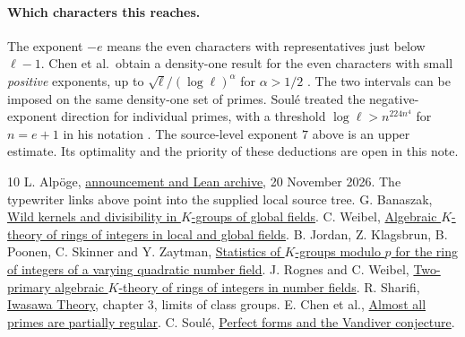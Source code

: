 \documentclass[11pt]{article}
\begin{document}
\paragraph{Which characters this reaches.}
The exponent $-e$ means the even characters with representatives just below
$\ell-1$. Chen et al.\ obtain a density-one result for the even characters
with small \emph{positive} exponents, up to $\sqrt{\ell}/(\log\ell)^\alpha$
for $\alpha>1/2$ \cite{chen}. The two intervals can be imposed on the
same density-one set of primes. Soul\'e treated the negative-exponent
direction for individual primes, with a threshold
$\log\ell>n^{224n^4}$ for $n=e+1$ in his notation \cite{soule}.
The source-level exponent $7$ above is an upper estimate. Its optimality
and the priority of these deductions are open in this note.

\small
\begin{thebibliography}{10}
 L. Alp\"oge, \href{https://alpo.ge/remark.pdf}{announcement and Lean archive}, 20 November 2026. The typewriter links above point into the supplied local source tree.
 G. Banaszak, \href{https://arxiv.org/abs/1208.2137}{Wild kernels and divisibility in \(K\)-groups of global fields}.
 C. Weibel, \href{https://sites.math.rutgers.edu/~weibel/papers-dir/KZsurvey-published.pdf}{Algebraic \(K\)-theory of rings of integers in local and global fields}.
 B. Jordan, Z. Klagsbrun, B. Poonen, C. Skinner and Y. Zaytman, \href{https://arxiv.org/abs/1703.00108}{Statistics of \(K\)-groups modulo \(p\) for the ring of integers of a varying quadratic number field}.
 J. Rognes and C. Weibel, \href{https://sites.math.rutgers.edu/~weibel/archive/papers-dir/RognesWeibel.pdf}{Two-primary algebraic \(K\)-theory of rings of integers in number fields}.
 R. Sharifi, \href{https://math.ucla.edu/~sharifi/notes/iwasawa-ch03.html}{Iwasawa Theory}, chapter 3, limits of class groups.
 E. Chen et al., \href{https://arxiv.org/abs/2602.05090}{Almost all primes are partially regular}.
 C. Soul\'e, \href{https://arxiv.org/abs/math/9812171}{Perfect forms and the Vandiver conjecture}.
\end{thebibliography}
\end{document}
